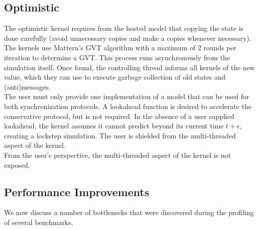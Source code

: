 \subsection{Optimistic}
The optimistic kernel requires from the hosted model that copying the state is done carefully (avoid unnecessary copies and make a copies whenever necessary).\\
The kernels use Mattern's \cite{mattern}
GVT algorithm with a maximum of 2 rounds per iteration to determine a GVT. This process runs asynchronously from the simulation itself. Once found, the controlling thread informs all kernels of the new value, which they can use to execute garbage collection of old states and (anti)messages.\\
The user must only provide one implementation of a model that can be used for both synchronization protocols. A lookahead function is desired to accelerate the conservative protocol, but is not required. In the absence of a user supplied lookahead, the kernel assumes it cannot predict beyond its current time $t+\epsilon$, creating a lockstep simulation. %
The user is shielded from the multi-threaded aspect of the kernel.\\
From the user's perspective, the multi-threaded aspect of the kernel is not exposed. %

\subsection{Performance Improvements}
We now discuss a number of bottlenecks that were discovered during the profiling of several benchmarks.
